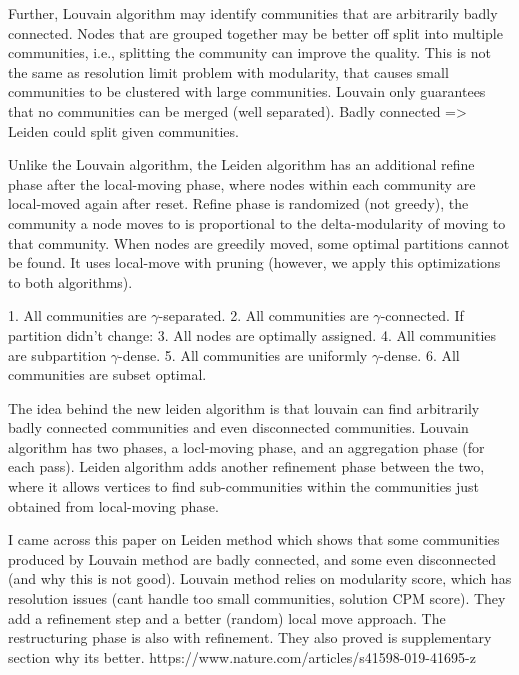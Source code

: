 
Further, Louvain algorithm may identify communities that are arbitrarily badly connected. Nodes that are grouped together may be better off split into multiple communities, i.e., splitting the community can improve the quality. This is not the same as resolution limit problem with modularity, that causes small communities to be clustered with large communities. Louvain only guarantees that no communities can be merged (well separated). Badly connected => Leiden could split given communities.



Unlike the Louvain algorithm, the Leiden algorithm has an additional refine phase after the local-moving phase, where nodes within each community are local-moved again after reset. Refine phase is randomized (not greedy), the community a node moves to is proportional to the delta-modularity of moving to that community. When nodes are greedily moved, some optimal partitions cannot be found. It uses local-move with pruning (however, we apply this optimizations to both algorithms).



1. All communities are $\gamma$-separated.
2. All communities are $\gamma$-connected.
If partition didn’t change:
3. All nodes are optimally assigned.
4. All communities are subpartition $\gamma$-dense.
5. All communities are uniformly $\gamma$-dense.
6. All communities are subset optimal.



The idea behind the new leiden algorithm is that louvain can find arbitrarily badly connected communities and even disconnected communities. Louvain algorithm has two phases, a locl-moving phase, and an aggregation phase (for each pass). Leiden algorithm adds another refinement phase between the two, where it allows vertices to find sub-communities within the communities just obtained from local-moving phase.



I came across this paper on Leiden method which shows that some communities produced by Louvain method are badly connected, and some even disconnected (and why this is not good). Louvain method relies on modularity score, which has resolution issues (cant handle too small communities, solution CPM score). They add a refinement step and a better (random) local move approach. The restructuring phase is also with refinement. They also proved is supplementary section why its better.
https://www.nature.com/articles/s41598-019-41695-z

